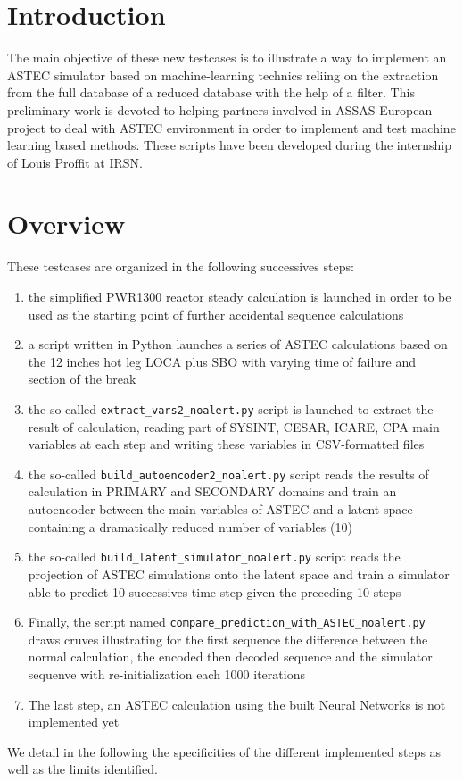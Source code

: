 \makeatletter
\graphicspath{
 {./@path/figures/}
 {./@path/../build_models/}
 {./@path/../run_meta/results/}
 {@path/figures/}
 {@path/../build_models/}
 {@path/../run_meta/results/}
}
\makeatother

\section{Introduction}

The main objective of these new testcases is to illustrate a way to implement an ASTEC simulator based on machine-learning technics reliing on the extraction from the full database of
a reduced database with the help of a filter.
This preliminary work is devoted to helping partners involved in ASSAS European project to deal with ASTEC environment in order to implement and test machine learning based methods.
These scripts have been developed during the internship of Louis Proffit at IRSN.


\section{Overview}

These testcases are organized in the following successives steps:
\begin{enumerate}
\item the simplified PWR1300 reactor steady calculation is launched in order to be used as the starting point of further accidental sequence calculations
\item a script written in Python launches a series of ASTEC calculations based on the 12 inches hot leg LOCA plus SBO with varying time of failure and section of the break
\item the so-called \verb+extract_vars2_noalert.py+ script is launched to extract the result of calculation, reading part of SYSINT, CESAR, ICARE, CPA main variables at each step and writing these variables in CSV-formatted files
\item the so-called \verb+build_autoencoder2_noalert.py+ script reads the results of calculation in PRIMARY and SECONDARY domains and train an autoencoder between 
the main variables of ASTEC and a latent space containing a dramatically reduced number of variables (10)
\item the so-called \verb+build_latent_simulator_noalert.py+ script reads the projection of ASTEC simulations onto the latent space and train a simulator able to predict 10 successives time step given the preceding 10 steps
\item Finally, the script named \verb+compare_prediction_with_ASTEC_noalert.py+ draws cruves illustrating for the first sequence the difference between the normal calculation, the encoded then decoded sequence and the simulator sequenve with re-initialization each 1000 iterations
\item The last step, an ASTEC calculation using the built Neural Networks is not implemented yet
\end{enumerate}
We detail in the following the specificities of the different implemented steps as well as the limits identified.


